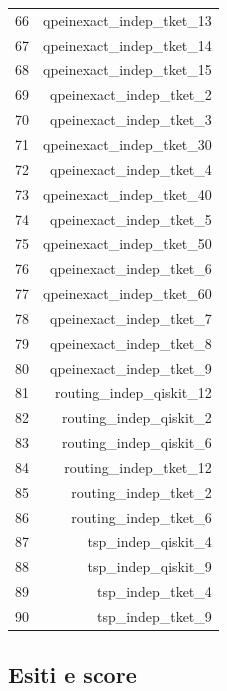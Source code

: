 \begin{longtable}{lr}
66 & qpeinexact\_indep\_tket\_13 \\
67 & qpeinexact\_indep\_tket\_14 \\
68 & qpeinexact\_indep\_tket\_15 \\
69 & qpeinexact\_indep\_tket\_2 \\
70 & qpeinexact\_indep\_tket\_3 \\
71 & qpeinexact\_indep\_tket\_30 \\
72 & qpeinexact\_indep\_tket\_4 \\
73 & qpeinexact\_indep\_tket\_40 \\
74 & qpeinexact\_indep\_tket\_5 \\
75 & qpeinexact\_indep\_tket\_50 \\
76 & qpeinexact\_indep\_tket\_6 \\
77 & qpeinexact\_indep\_tket\_60 \\
78 & qpeinexact\_indep\_tket\_7 \\
79 & qpeinexact\_indep\_tket\_8 \\
80 & qpeinexact\_indep\_tket\_9 \\
81 & routing\_indep\_qiskit\_12 \\
82 & routing\_indep\_qiskit\_2 \\
83 & routing\_indep\_qiskit\_6 \\
84 & routing\_indep\_tket\_12 \\
85 & routing\_indep\_tket\_2 \\
86 & routing\_indep\_tket\_6 \\
87 & tsp\_indep\_qiskit\_4 \\
88 & tsp\_indep\_qiskit\_9 \\
89 & tsp\_indep\_tket\_4 \\
90 & tsp\_indep\_tket\_9 \\
\end{longtable}
\endgroup
\clearpage\subsection{Esiti e score}
\begingroup\scriptsize
\setlength{\tabcolsep}{5pt}
